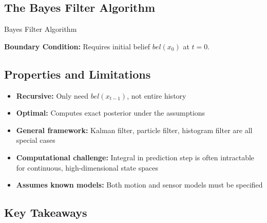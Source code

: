 \subsection{The Bayes Filter Algorithm}

\begin{algorithm}[H]
\caption{Bayes Filter Algorithm}

\BlankLine
{}

\BlankLine
{}

\BlankLine
{}
\end{algorithm}

\textbf{Boundary Condition:} Requires initial belief $bel(x_0)$ at $t=0$.

\subsection{Properties and Limitations}

\begin{itemize}
    \item \textbf{Recursive:} Only need $bel(x_{t-1})$, not entire history
    \item \textbf{Optimal:} Computes exact posterior under the assumptions
    \item \textbf{General framework:} Kalman filter, particle filter, histogram filter are all special cases
    \item \textbf{Computational challenge:} Integral in prediction step is often intractable for continuous, high-dimensional state spaces
    \item \textbf{Assumes known models:} Both motion and sensor models must be specified
\end{itemize}

\subsection{Key Takeaways}

